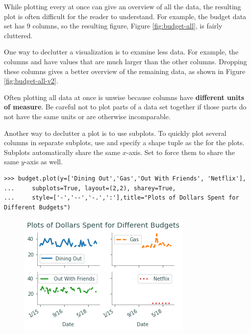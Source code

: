 While plotting every  at once can give an overview of all the data, the resulting plot is often difficult for the reader to understand.
For example, the budget data set has 9 columns, so the resulting figure, Figure \ref{fig:budget-all}, is fairly cluttered.

One way to declutter a visualization is to examine less data.
For example, the columns  and  have values that are much larger than the other columns.
Dropping these columns gives a better overview of the remaining data, as shown in Figure \ref{fig:budget-all-v2}.

\begin{warn}
Often plotting all data at once is unwise because columns have \textbf{different units of measure}.
Be careful not to plot parts of a data set together if those parts do not have the same units or are otherwise incomparable.
\end{warn}

Another way to declutter a plot is to use subplots.
To quickly plot several columns in separate subplots, use  and specify a shape tuple as the  for the plots.
Subplots automatically share the same $x$-axis.
Set  to force them to share the same $y$-axis as well.

\begin{lstlisting}
>>> budget.plot(y=['Dining Out','Gas','Out With Friends', 'Netflix'],
... 	subplots=True, layout=(2,2), sharey=True,
... 	style=['-','--','-.',':'],title="Plots of Dollars Spent for Different Budgets")
\end{lstlisting}

\begin{figure}[H]
    \includegraphics[width=.8\textwidth]{figures/line_subplots.pdf}
\end{figure}

